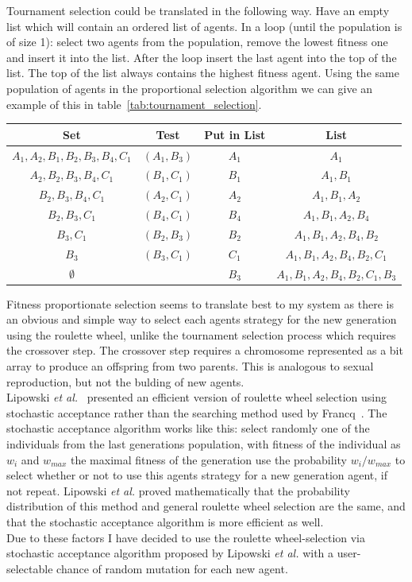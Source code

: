 \documentclass[]{final_report}
\begin{document}
Tournament selection could be translated in the following way. Have an empty list which will contain an ordered list of agents. In a loop (until the population is of size 1): select two agents from the population, remove the lowest fitness one and insert it into the list. After the loop insert the last agent into the top of the list. The top of the list always contains the highest fitness agent. Using the same population of agents in the proportional selection algorithm we can give an example of this in table~\ref{tab:tournament_selection}.
\begin{framed}
	\begin{center}
		\begin{tabular}{c|c|c|c}
		Set & Test & Put in List & List\\
		\hline
		${A_1, A_2, B_1, B_2, B_3, B_4, C_1}$ & $(A_1, B_3)$ & $A_1$ & ${A_1}$ \\
		${A_2, B_2, B_3, B_4, C_1}$ & $(B_1, C_1)$ & $B_1$ & ${A_1, B_1}$\\
		${B_2, B_3, B_4, C_1}$ & $(A_2, C_1)$ & $A_2$ & ${A_1, B_1, A_2}$\\
		${B_2, B_3, C_1}$ & $(B_4, C_1)$ & $B_4$ & ${A_1, B_1, A_2, B_4}$\\
		${B_3, C_1}$ & $(B_2, B_3)$ & $B_2$ & ${A_1, B_1, A_2, B_4, B_2}$\\
		${B_3}$ & $(B_3, C_1)$ & $C_1$ & ${A_1, B_1, A_2, B_4, B_2, C_1}$\\
		$\emptyset$	& & $B_3$ & ${A_1, B_1, A_2, B_4, B_2, C_1, B_3}$
		\end{tabular}
		\label{tab:tournament_selection}
	\end{center}	
\end{framed}
Fitness proportionate selection seems to translate best to my system as there is an obvious and simple way to select each agents strategy for the new generation using the roulette wheel, unlike the tournament selection process which requires the crossover step. The crossover step requires a chromosome represented as a bit array to produce an offspring from two parents. This is analogous to sexual reproduction, but not the bulding of new agents.\\
Lipowski \textit{et al.}~\cite{lipowski2012roulette} presented an efficient version of roulette wheel selection using stochastic acceptance rather than the searching method used by Francq~\cite{genetic_algorithms}. The stochastic acceptance algorithm works like this: select randomly one of the individuals from the last generations population, with fitness of the individual as $w_i$ and $w_{max}$ the maximal fitness of the generation use the probability $w_i / w_{max}$ to select whether or not to use this agents strategy for a new generation agent, if not repeat. Lipowski \textit{et al.} proved mathematically that the probability distribution of this method and general roulette wheel selection are the same, and that the stochastic acceptance algorithm is more efficient as well.\\
Due to these factors I have decided to use the roulette wheel-selection via stochastic acceptance algorithm proposed by Lipowski \textit{et al.} with a user-selectable chance of random mutation for each new agent.
\end{document}
